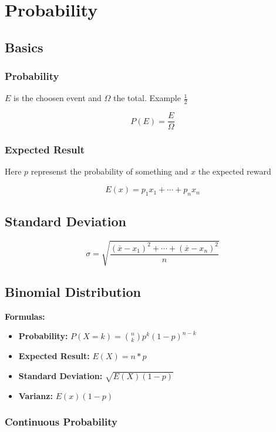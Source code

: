 \section{Probability}

\subsection{Basics}

\subsubsection{Probability}

\(E\) is the choosen event and \(\Omega\) the total. Example \(\frac{1}{2}\)

\[P(E) = \frac{E}{\Omega}\]

\subsubsection{Expected Result}

Here \(p\) represenst the probability of 
something and \(x\) the expected reward

\[E(x) = p_1 x_1 + \cdots + p_n x_n\]

\subsection{Standard Deviation}

\[
\sigma = \sqrt{ \frac{ (\overline{x} - x_1)^2 + \cdots + (\overline{x} - x_n)^2 }{ n } }
\]


\subsection{Binomial Distribution}

\textbf{Formulas:}

\begin{itemize}[label=\(-\)]
    \item \textbf{Probability: } \(P(X = k) = \binom{n}{k} p^k (1 - p)^{n - k}\)
    \item \textbf{Expected Result: } \(E(X) = n * p\)
    \item \textbf{Standard Deviation: } \(\sqrt{E(X)(1-p)}\)
    \item  \textbf{Varianz: } \(E(x)(1-p)\)
\end{itemize}

\subsubsection{Continuous Probability}

